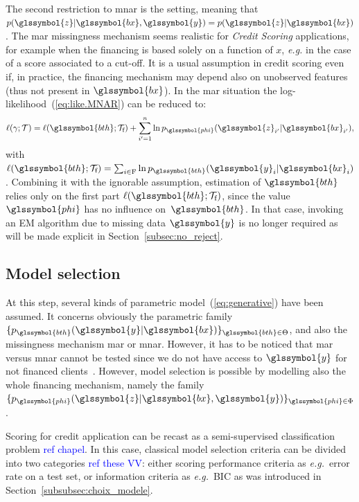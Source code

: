 The second restriction to \gls{mnar} is the  setting, meaning that $p(\glssymbol{z}| \glssymbol{bx},\glssymbol{y}) = p(\glssymbol{z}|\glssymbol{bx})$. The \gls{mar} missingness mechanism seems realistic for \textit{Credit Scoring} applications, for example when the financing is based solely on a function of $x$, {\it e.g.} in the case of a score associated to a cut-off. It is a usual assumption in credit scoring even if, in practice, the financing mechanism may depend also on unobserved features (thus not present in $\glssymbol{bx}$). In the \gls{mar} situation the log-likelihood~(\ref{eq:like.MNAR}) can be reduced to:
\begin{equation}\label{eq:like.MAR}
\ell(\gamma;\mathcal{T}) = \ell(\glssymbol{bth};\mathcal{T}_{\text{f}}) + \sum_{i'=1}^n \ln p_{\glssymbol{phi}}(\glssymbol{z}_{i'} | \glssymbol{bx}_{i'}),
\end{equation}
with $\ell(\glssymbol{bth};\mathcal{T}_{\text{f}})=\sum_{i\in\text{F}}\ln p_{\glssymbol{bth}}(\glssymbol{y}_i | \glssymbol{bx}_i)$.
Combining it with the ignorable assumption, estimation of $\glssymbol{bth}$ relies only on the first part $\ell(\glssymbol{bth};\mathcal{T}_{\text{f}})$, since the value $\glssymbol{phi}$ has no influence on~$\glssymbol{bth}$. In that case, invoking an EM algorithm due to missing data $\glssymbol{y}$ is no longer required as will be made explicit in Section~\ref{subsec:no_reject}.

\subsection{Model selection}

At this step, several kinds of parametric model~(\ref{eq:generative}) have been assumed. It concerns obviously the parametric family $\{p_{\glssymbol{bth}}(\glssymbol{y}|\glssymbol{bx})\}_{\glssymbol{bth} \in\Theta}$, and also the missingness mechanism \gls{mar} or \gls{mnar}. 
However, it has to be noticed that \gls{mar} versus \gls{mnar} cannot be tested since we do not have access to $\glssymbol{y}$ for not financed clients~\cite{molenberghs2008every}. However, model selection is possible by modelling also the whole financing mechanism, namely the family $\{p_{\glssymbol{phi}}(\glssymbol{z}|\glssymbol{bx},\glssymbol{y})\}_{\glssymbol{phi} \in \Phi}$.


Scoring for credit application can be recast as a semi-supervised classification problem \textcolor{blue}{ref chapel}. In this case, classical model selection criteria can be divided into two categories \textcolor{blue}{ref these VV}: either scoring performance criteria as \textit{e.g.}\ error rate on a test set, or information criteria as \textit{e.g.}\ BIC as was introduced in Section~\ref{subsubsec:choix_modele}.

